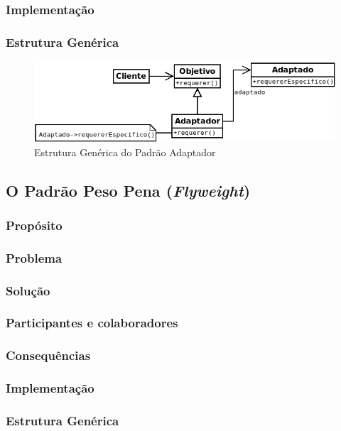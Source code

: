 \subsubsection{Implementação}
\subsubsection{Estrutura Genérica}

\begin{figure}[h]
\begin{center}
\includegraphics[scale=0.6]{adaptador.png}
\caption{Estrutura Genérica do Padrão Adaptador}\label{fig:adaptador}
\end{center}
\end{figure}

\subsection{O Padrão Peso Pena (\textit{Flyweight})}
\subsubsection{Propósito}
\subsubsection{Problema}
\subsubsection{Solução}
\subsubsection{Participantes e colaboradores}
\subsubsection{Consequências}
\subsubsection{Implementação}
\subsubsection{Estrutura Genérica}

